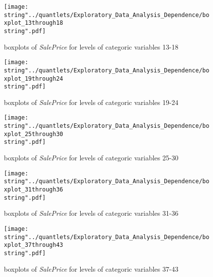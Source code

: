 \begin{figure}[H]
\centering
\begin{minipage}{.5\textwidth}
	\centering
	\texttt{[image: \\string"../quantlets/Exploratory\_Data\_Analysis\_Dependence/boxplot\_13through18\\string".pdf]}
  	\caption{boxplots of \textit{SalePrice} for levels of categoric variables 13-18}
  	\label{fig:box13to18}
\end{minipage}%
\begin{minipage}{.5\textwidth}
\centering
	\texttt{[image: \\string"../quantlets/Exploratory\_Data\_Analysis\_Dependence/boxplot\_19through24\\string".pdf]}
  	\caption{boxplots of \textit{SalePrice} for levels of categoric variables 19-24}
  	\label{fig:box19to24}
\end{minipage}
\end{figure}

\begin{figure}[H]
\centering
\begin{minipage}{.5\textwidth}
	\centering
	\texttt{[image: \\string"../quantlets/Exploratory\_Data\_Analysis\_Dependence/boxplot\_25through30\\string".pdf]}
  	\caption{boxplots of \textit{SalePrice} for levels of categoric variables 25-30}
  	\label{fig:box25to30}
\end{minipage}%
\begin{minipage}{.5\textwidth}
\centering
	\texttt{[image: \\string"../quantlets/Exploratory\_Data\_Analysis\_Dependence/boxplot\_31through36\\string".pdf]}
  	\caption{boxplots of \textit{SalePrice} for levels of categoric variables 31-36}
  	\label{fig:box31to36}
\end{minipage}
\end{figure}

\begin{figure}[H]
\centering
\begin{minipage}{.5\textwidth}
\centering
	\texttt{[image: \\string"../quantlets/Exploratory\_Data\_Analysis\_Dependence/boxplot\_37through43\\string".pdf]}
  	\caption{boxplots of \textit{SalePrice} for levels of categoric variables 37-43}
  	\label{fig:box37to43}
\end{minipage}
\end{figure}




